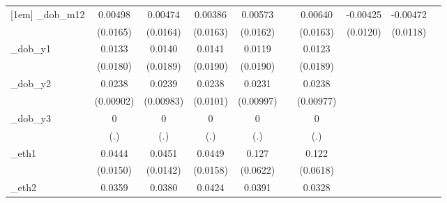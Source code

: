 \begin{table}[htbp]
\begin{tabular}{l*{9}{c}}
[1em]
\_dob\_m12    &     0.00498         &     0.00474         &     0.00386         &     0.00573         &                     &     0.00640         &    -0.00425         &    -0.00472         &                     \\
            &    (0.0165)         &    (0.0164)         &    (0.0163)         &    (0.0162)         &                     &    (0.0163)         &    (0.0120)         &    (0.0118)         &                     \\
[1em]
\_dob\_y1     &      0.0133         &      0.0140         &      0.0141         &      0.0119         &                     &      0.0123         &                     &                     &                     \\
            &    (0.0180)         &    (0.0189)         &    (0.0190)         &    (0.0190)         &                     &    (0.0189)         &                     &                     &                     \\
[1em]
\_dob\_y2     &      0.0238\sym{***}&      0.0239\sym{**} &      0.0238\sym{**} &      0.0231\sym{**} &                     &      0.0238\sym{**} &                     &                     &                     \\
            &   (0.00902)         &   (0.00983)         &    (0.0101)         &   (0.00997)         &                     &   (0.00977)         &                     &                     &                     \\
[1em]
\_dob\_y3     &           0         &           0         &           0         &           0         &                     &           0         &                     &                     &                     \\
            &         (.)         &         (.)         &         (.)         &         (.)         &                     &         (.)         &                     &                     &                     \\
[1em]
\_eth1       &      0.0444\sym{***}&      0.0451\sym{***}&      0.0449\sym{***}&       0.127\sym{**} &                     &       0.122\sym{**} &                     &                     &                     \\
            &    (0.0150)         &    (0.0142)         &    (0.0158)         &    (0.0622)         &                     &    (0.0618)         &                     &                     &                     \\
[1em]
\_eth2       &      0.0359\sym{***}&      0.0380\sym{***}&      0.0424\sym{***}&      0.0391\sym{***}&                     &      0.0328\sym{***}&                     &                     &                     \\

\end{tabular}
\end{table}
